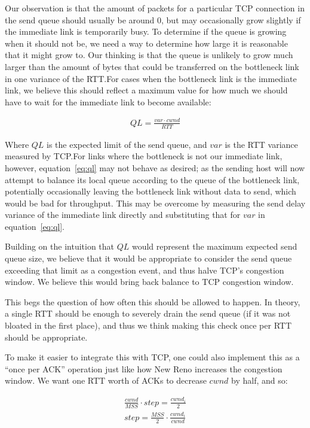 Our observation is that the amount of packets for a particular TCP connection in
the send queue should usually be around 0, but may occasionally grow slightly if
the immediate link is temporarily busy. To determine if the queue is growing
when it should not be, we need a way to determine how large it is reasonable
that it might grow to. Our thinking is that the queue is unlikely to grow much
larger than the amount of bytes that could be transferred on the bottleneck link
in one variance of the RTT.\@ For cases when the bottleneck link is the
immediate link, we believe this should reflect a maximum value for how much we
should have to wait for the immediate link to become available:

\begin{align}
  QL = \frac{var \cdot cwnd}{RTT}\label{eq:ql}
\end{align}

Where $QL$ is the expected limit of the send queue, and $var$ is the RTT
variance measured by TCP.\@ For links where the bottleneck is not our immediate
link, however, equation~\ref{eq:ql} may not behave as desired; as the sending
host will now attempt to balance its local queue according to the queue of the
bottleneck link, potentially occasionally leaving the bottleneck link without
data to send, which would be bad for throughput. This may be overcome by
measuring the send delay variance of the immediate link directly and
substituting that for $var$ in equation~\ref{eq:ql}.

Building on the intuition that $QL$ would represent the maximum expected send
queue size, we believe that it would be appropriate to consider the send queue
exceeding that limit as a congestion event, and thus halve TCP's congestion
window. We believe this would bring back balance to TCP congestion window.

This begs the question of how often this should be allowed to happen. In theory,
a single RTT should be enough to severely drain the send queue (if it was not
bloated in the first place), and thus we think making this check once per RTT
should be appropriate.

To make it easier to integrate this with TCP, one could also implement this as a
``once per ACK'' operation just like how New Reno increases the congestion
window. We want one RTT worth of ACKs to decrease $cwnd$ by half, and so:

\begin{align}
  \frac{cwnd}{MSS} \cdot step = \frac{cwnd_i}{2} \\
  step = \frac{MSS}{2} \cdot \frac{cwnd_i}{cwnd}
\end{align}

